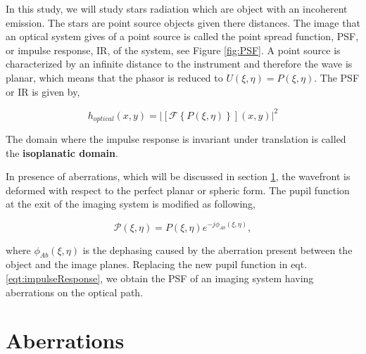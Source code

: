 In this study, we will study stars radiation which are object with an incoherent emission. The stars are point source objects given there distances. The image that an optical system gives of a point source is called the point spread function, PSF, or impulse response, IR, of the system, see Figure \ref{fig:PSF}. A point source is characterized by an infinite distance to the instrument and therefore the wave is planar, which means that the phasor is reduced to $U(\xi,\eta) = P(\xi,\eta)$. The PSF or IR is given by,

\begin{equation}
h_{optical}(x,y) = |\left[\mathcal{F}\left\lbrace P(\xi,\eta) \right\rbrace\right](x,y)|^2
\label{eqt:impulseResponse}
\end{equation}

The domain where the impulse response is invariant under translation is called the \textbf{isoplanatic domain}.

In presence of aberrations, which will be discussed in section \ref{sec:Aberrations}, the wavefront is deformed with respect to the perfect planar or spheric form. The pupil function at the exit of the imaging system is modified as following,

\begin{equation}
\mathcal{P}(\xi,\eta) = P(\xi,\eta) e^{-j\phi_{Ab}(\xi,\eta)},
\label{eqt:aberratedPhasor}
\end{equation}

where $\phi_{Ab}(\xi,\eta)$ is the dephasing caused by the aberration present between the object and the image planes. Replacing the new pupil function in eqt. \eqref{eqt:impulseResponse}, we obtain the PSF of an imaging system having aberrations on the optical path.

\section{Aberrations}
\label{sec:Aberrations}

